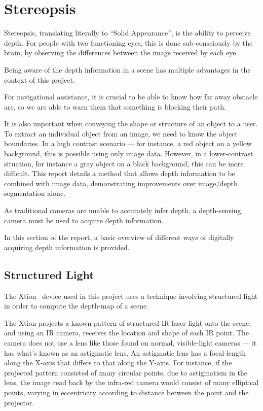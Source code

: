 \section{Stereopsis}
Stereopsis, translating literally to ``Solid Appearance'', is the ability to perceive depth. For people with two functioning eyes, this is done sub-consciously by the brain, by observing the differences between the image received by each eye.

Being aware of the depth information in a scene has multiple advantages in the context of this project.

For navigational assistance, it is crucial to be able to know how far away obstacle are, so we are able to warn them that something is blocking their path.

It is also important when conveying the shape or structure of an object to a user. To extract an individual object from an image, we need to know the object boundaries. In a high contrast scenario --- for instance, a red object on a yellow background, this is possible using only image data. However, in a lower-contrast situation, for instance a gray object on a black background, this can be more difficult. This report details a method that allows depth information to be combined with image data, demonstrating improvements over image/depth segmentation alone. 

As traditional cameras are unable to accurately infer depth, a depth-sensing camera must be used to acquire depth information.

In this section of the report, a basic overview of different ways of digitally acquiring depth information is provided.

\subsection{Structured Light}
The Xtion~\cite{xtion} device used in this project uses a technique involving structured light in order to compute the depth-map of a scene.

The Xtion projects a known pattern of structured \ac{IR} laser light onto the scene, and using an \ac{IR} camera, receives the location and shape of each \ac{IR} point. The camera does not use a lens like those found on normal, visible-light cameras --- it has what's known as an astigmatic lens. An astigmatic lens has a focal-length along the X-axis that differs to that along the Y-axis. For instance, if the projected pattern consisted of many circular points, due to astigmatism in the lens, the image read back by the infra-red camera would consist of many elliptical points, varying in eccentricity according to distance between the point and the projector.

